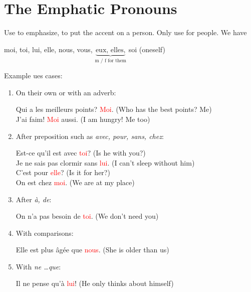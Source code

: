 \documentclass{book}
\begin{document}
    \section{The Emphatic Pronouns}
    Use to emphasize, to put the accent on a person. Only use for people. We have 
        \begin{center}
            moi, toi, lui, elle, nous, vous, $\underbrace{\text{eux, elles,}}_{\text{m / f for them}}$ soi (oneself)
        \end{center}
    Example ues cases:
        \begin{enumerate}
            \item On their own or with an adverb:
                \begin{center}
                    Qui a les meilleurs points? \textcolor{red}{Moi}. \quad (Who has the best points? Me) \\
                    J'ai faim! \textcolor{red}{Moi} aussi. \quad (I am hungry! Me too) 
                \end{center}
            \item After preposition such as \textit{avec, pour, sans, chez}:
                \begin{center}
                    Est-ce qu'il est avec \textcolor{red}{toi}? \quad (Is he with you?) \\
                    Je ne sais pas clormir sans \textcolor{red}{lui}. \quad (I can't sleep without him) \\
                    C'est pour \textcolor{red}{elle}? \quad (Is it for her?) \\
                    On est chez \textcolor{red}{moi}. \quad (We are at my place)
                \end{center}
            \item After \textit{à, de}:
                \begin{center}
                    On n'a pas besoin de \textcolor{red}{toi}. \quad (We don't need you) 
                \end{center}
            \item With comparisons:
                \begin{center}
                    Elle est plus âgée que \textcolor{red}{nous}. \quad (She is older than us)
                \end{center}
            \item With \textit{ne \dots que}:
                \begin{center}
                    Il ne pense qu'à \textcolor{red}{lui}! \quad (He only thinks about himself) \\

\end{center}
\end{enumerate}
\end{document}
